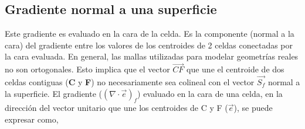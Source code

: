 






\subsection{Gradiente normal a una superficie}
%
Este gradiente es evaluado en la cara de la celda.
%
Es la componente (normal a la cara) del gradiente entre los valores de los
centroides de 2 celdas conectadas por la cara evaluada.
%
En general, las mallas utilizadas para modelar geometrías reales no son
ortogonales.
%
Esto implica que el vector $\vec{CF}$ que une el centroide de dos celdas
contiguas (\textbf{C} y \textbf{F}) no necesariamente sea colineal con el vector
$\vec{S_{f}}$ normal a la superficie.
%
El gradiente ($(\nabla\cdot\vec{e})_{f}$) evaluado en la cara de una celda, en
la dirección del vector unitario que une los centroides de C y F ($\vec{e}$), se
puede expresar como,

